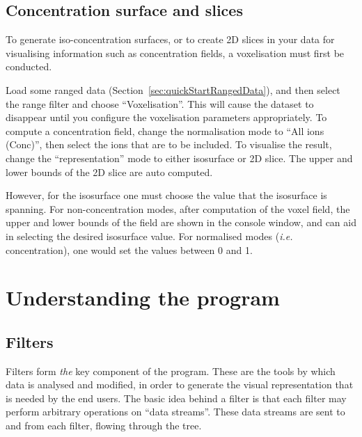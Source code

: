 \documentclass[10pt]{article}
\begin{document}
\subsection{Concentration surface and slices}

To generate iso-concentration surfaces, or to create 2D slices in your data for visualising information such as concentration fields, a voxelisation must first be conducted.

Load some ranged data (Section~\ref{sec:quickStartRangedData}), and then select the range filter and choose ``Voxelisation''. This will cause the dataset to disappear until you configure the voxelisation parameters appropriately. To compute a concentration field, change the normalisation mode to ``All ions (Conc)'', then select the ions that are to be included.  To visualise the result, change the ``representation'' mode to either isosurface or 2D slice. The upper and lower bounds of the 2D slice are auto computed. 

However, for the isosurface one must choose the value that the isosurface is spanning. For non-concentration modes, after computation of the voxel field, the upper and lower bounds of the field are shown in the console window, and can aid in selecting the desired isosurface value. For normalised modes (\emph{i.e.} concentration), one would set the values between 0 and 1.

\FloatBarrier

\section{Understanding the program}
\subsection{Filters}

Filters form \emph{the} key component of the program. These are the tools by which data is analysed and modified, in order to generate the visual representation that is needed by the end users. The basic idea behind a filter is that each filter may perform arbitrary operations on ``data streams''. These data streams are sent to and from each filter, flowing through the tree.
\end{document}
